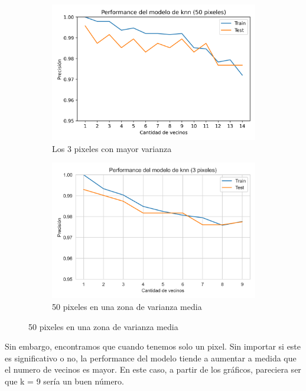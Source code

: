 \documentclass[10pt,a4paper]{article}
\begin{document}
\begin{figure}[ht!]
	\begin{subfigure}{0.5\textwidth}
		\includegraphics[width=0.9\linewidth]{Informe/Imagenes/50pixeles.png} 
		\caption{Los 3 pixeles con mayor varianza}
		\label{fig:subfig1}
	\end{subfigure}
	\begin{subfigure}{0.5\textwidth}
		\includegraphics[width=0.9\linewidth]{Informe/Imagenes/3pixeles.png}
		\caption{50 pixeles en una zona de varianza media}
		\label{fig:subfig2}
	\end{subfigure}
	\label{fig:subfigs}
\end{figure}

Sin embargo, encontramos que cuando tenemos solo un pixel. Sin importar si este es significativo o no, la performance del modelo tiende a aumentar a medida
que el numero de vecinos es mayor. En este caso, a partir de los gráficos, pareciera ser que k = 9 sería un buen número.
\end{document}
